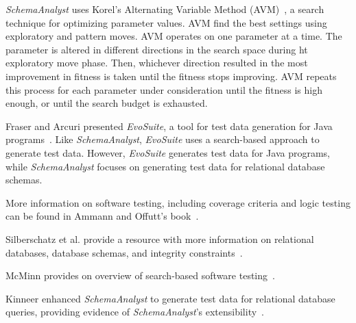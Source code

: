 
\textit{SchemaAnalyst} uses Korel's Alternating Variable Method (AVM)~\cite{Korel:AVM}, a search technique for
optimizing parameter values. AVM find the best settings using exploratory and pattern moves. AVM operates on one
parameter at a time. The parameter is altered in different directions in the search space during ht exploratory move
phase.  Then, whichever direction resulted in the most improvement in fitness is taken until the fitness stops
improving. AVM repeats this process for each parameter under consideration until the fitness is high enough, or until
the search budget is exhausted.

Fraser and Arcuri presented \textit{EvoSuite}, a tool for test data generation for Java
programs~\cite{Fraser2011evosuite}.  Like \textit{SchemaAnalyst}, \textit{EvoSuite} uses a search-based approach to
generate test data. However, \textit{EvoSuite} generates test data for Java programs, while \textit{SchemaAnalyst}
focuses on generating test data for relational database schemas.

More information on software testing, including coverage criteria and logic testing can be found in Ammann and Offutt's
book~\cite{ammann2008}.

Silberschatz et al. provide a resource with more information on relational databases, database schemas, and integrity
constraints~\cite{databasebook}.

McMinn provides on overview of search-based software testing~\cite{STVR:STVR294}.

Kinneer enhanced \textit{SchemaAnalyst} to generate test data for relational database queries, providing evidence of
\textit{SchemaAnalyst}'s extensibility~\cite{kinneer2016comp}.
